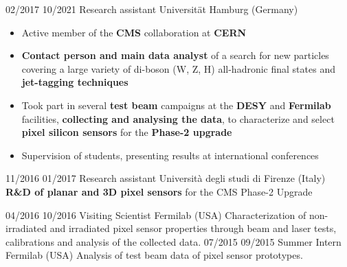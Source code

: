     \position
      {02/2017 \textemdash{} 10/2021}
      {Research assistant}
      {Universit\"{a}t Hamburg (Germany)}
      {\begin{itemize}
\item Active member of the {\bf CMS} collaboration at {\bf CERN}
\item {\bf Contact person and main data analyst} of a search for new particles covering a large variety of di-boson (W, Z, H) all-hadronic final states and {\bf  jet-tagging techniques}
\item Took part in several {\bf test beam} campaigns at the {\bf DESY} and {\bf Fermilab} facilities, {\bf collecting and analysing the data}, to characterize and select {\bf pixel silicon sensors} for the {\bf Phase-2 upgrade}
\item Supervision of students, presenting results at international conferences
\end{itemize}
}
    \position
      {11/2016 \textemdash{} 01/2017}
      {Research assistant}
      {Universit\`a degli studi di Firenze (Italy)}
      {{\bf R\&D of planar and 3D pixel sensors} for the CMS Phase-2  Upgrade}

    \position
      {04/2016 \textemdash{} 10/2016}
      {Visiting Scientist}
      {Fermilab (USA)}
      {Characterization of non-irradiated and irradiated pixel sensor properties through beam and laser tests, calibrations and analysis of the collected data.}
    \position
      {07/2015 \textemdash{} 09/2015}
      {Summer Intern}
      {Fermilab (USA)}
      {Analysis of test beam data of pixel sensor prototypes.}
\fi
